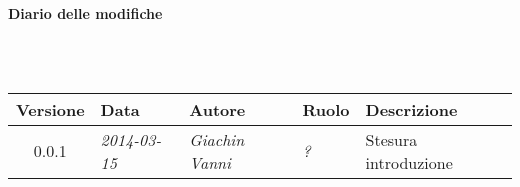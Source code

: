 \noindent\begin{Large}\textbf{Diario delle modifiche}\end{Large}\\
\\
\begin{small}
\begin{tabular}{|c|p{1.8cm}|p{2.8cm}|p{2.8cm}|p{3.5cm}|}
\hline
Versione & Data & Autore & Ruolo & Descrizione \\
\hline
\hline
0.0.1 & \textit{2014-03-15} & 
\textit{Giachin Vanni} &
\textit{?} & Stesura introduzione\\
\hline
\end{tabular}\\
\end{small}